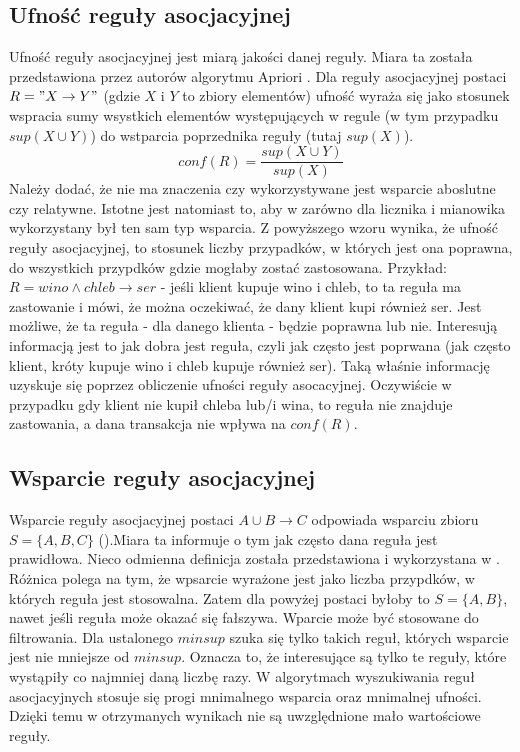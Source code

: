 \subsection{Ufność reguły asocjacyjnej}
\label{c224}
Ufność reguły asocjacyjnej jest miarą jakości danej reguły. Miara ta została przedstawiona przez autorów algorytmu Apriori \cite{Agrawal1994}. Dla reguły asocjacyjnej postaci \(R = "X\rightarrow Y"\) (gdzie \(X\) i \(Y\) to zbiory elementów) ufność wyraża się jako stosunek wspracia sumy wsystkich elementów występujących w regule (w tym przypadku \(sup(X \cup Y)\)) do wstparcia poprzednika reguły (tutaj \(sup(X)\)). 
\[conf(R) = \frac{sup(X \cup Y)}{sup(X)}\]
Należy dodać, że nie ma znaczenia czy wykorzystywane jest wsparcie aboslutne czy relatywne. Istotne jest natomiast to, aby w zarówno dla licznika i mianowika wykorzystany był ten sam typ wsparcia.
Z powyższego wzoru wynika, że ufność reguły asocjacyjnej, to stosunek liczby przypadków, w których jest ona poprawna, do wszystkich przypdków gdzie mogłaby zostać zastosowana.
Przykład: \(R = wino \wedge chleb \rightarrow ser\) - jeśli klient kupuje wino i chleb, to ta reguła ma zastowanie i mówi, że można oczekiwać, że dany klient kupi również ser. Jest możliwe, że ta reguła - dla danego klienta - będzie poprawna lub nie. Interesują informacją jest to jak dobra jest reguła, czyli jak często jest poprwana (jak często klient, króty kupuje wino i chleb kupuje również ser). Taką właśnie informację uzyskuje się poprzez obliczenie ufności reguły asocacyjnej. Oczywiście w przypadku gdy klient nie kupił chleba lub/i wina, to reguła nie znajduje zastowania, a dana transakcja nie wpływa na \(conf(R)\). 

\subsection{Wsparcie reguły asocjacyjnej}
\label{c225}
Wsparcie reguły asocjacyjnej postaci \(A \cup B \rightarrow C\) odpowiada wsparciu zbioru \(S = \{A, B, C\}\) (\cite{Agrawal}).Miara ta informuje o tym jak często dana reguła jest prawidłowa. Nieco odmienna definicja została przedstawiona i wykorzystana w \cite{Borgelt}. Różnica polega na tym, że wpsarcie wyrażone jest jako liczba przypdków, w których reguła jest stosowalna. Zatem dla powyżej postaci byłoby to \(S = \{A, B\}\), nawet jeśli reguła może okazać się fałszywa. 
Wparcie może być stosowane do filtrowania. Dla ustalonego \(minsup\) szuka się tylko takich reguł, których wsparcie jest nie mniejsze od \(minsup\). Oznacza to, że interesujące są tylko te reguły, które wystąpiły co najmniej daną liczbę razy.
W algorytmach wyszukiwania reguł asocjacyjnych stosuje się progi mnimalnego wsparcia oraz mnimalnej ufności. Dzięki temu w otrzymanych wynikach nie są uwzględnione mało wartościowe reguły.

